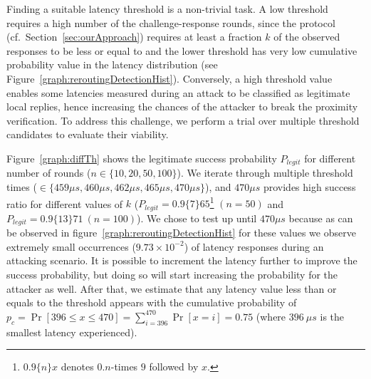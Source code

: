 \fi


\ifusenix
\vspace{-10pt}
\else
\fi
{} Finding a suitable latency threshold \connect is a non-trivial task. A low threshold requires a high number of the challenge-response rounds, since the protocol (cf.\ Section~\ref{sec:ourApproach}) requires at least a fraction $k$ of the observed responses to be less or equal to \connect and the lower threshold has very low cumulative probability value in the latency distribution (see Figure~\ref{graph:reroutingDetectionHist}).
Conversely, a high threshold value enables some latencies measured during an attack to be classified as legitimate local replies, hence increasing the chances of the attacker to break the proximity verification. To address this challenge, we perform a trial over multiple threshold candidates to evaluate their viability.

Figure~\ref{graph:diffTh} shows the legitimate success probability $P_{legit}$ for different number of rounds ($n\in\{10,20,50,100\}$). We iterate through multiple threshold times (\connect$\in\{459\mu s,460\mu s,462\mu s,465\mu s,470\mu s\}$), and $470\mu s$ provides high success ratio for different values of $k$ ($P_{legit}=0.9\{7\}65$\footnote{$0.9\{n\}x$ denotes $0.n$-times $9$ followed by $x$.} $(n=50)$ and $P_{legit}=0.9\{13\}71\ (n=100)$).
%
We chose to test \connect up until $470 \mu s$ because as can be observed in figure~\ref{graph:reroutingDetectionHist} for these values we observe extremely small occurrences ($9.73\times10^{-2}$) of latency responses during an attacking scenario. It is possible to increment the latency further to improve the success probability, but doing so will start increasing the probability for the attacker as well. 
%
After that, we estimate that any latency value less than or equals to the threshold \connect appears with the cumulative probability of $p_c = \Pr[396\leq x \leq 470] = \sum_{i=396}^{470}\Pr[x=i] = 0.75$ (where $396\ \mu s$ is the smallest latency experienced).
%

